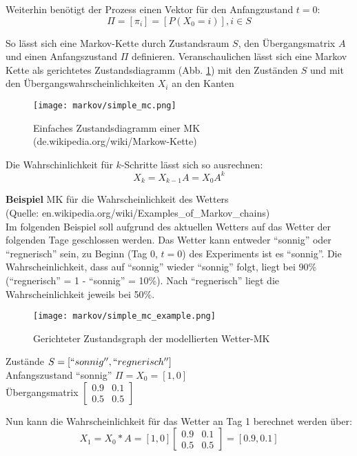 Weiterhin benötigt der Prozess einen Vektor für den Anfangzustand \( t = 0 \):
\[ \Pi = [ \pi_i] = [ P (X_0 = i) ] , i \in S \]

So lässt sich eine Markov-Kette durch Zustandsraum \(S\), den Übergangsmatrix \( A \) und einen Anfangszustand \( \Pi \) definieren.
Veranschaulichen lässt sich eine Markov Kette als gerichtetes Zustandsdiagramm (Abb. \ref{fig:simple_mc}) mit den Zuständen \(S\) und 
mit den Übergangswahrscheinlichkeiten \(X_i\) an den Kanten
\begin{figure}[htbp] \centering
    \texttt{[image: markov/simple\_mc.png]}
    \caption{Einfaches Zustandsdiagramm einer \acl{MK} (de.wikipedia.org/wiki/Markow-Kette)}
    \label{fig:simple_mc}
\end{figure}
Die Wahrschinlichkeit für \( k \)-Schritte lässt sich so ausrechnen: 
\[ X_k = X_{k-1} A = X_0 A^k \] 


\textbf{Beispiel} \acl{MK} für die Wahrscheinlichkeit des Wetters \\
(Quelle: en.wikipedia.org/wiki/Examples\_of\_Markov\_chains) \\
Im folgenden Beispiel soll aufgrund des aktuellen Wetters auf das Wetter der folgenden Tage geschlossen werden.
Das Wetter kann entweder ``sonnig'' oder ``regnerisch'' sein, zu Beginn (Tag 0, \( t = 0 \)) des Experiments ist es ``sonnig''.
Die Wahrscheinlichkeit, dass auf ``sonnig'' wieder ``sonnig'' folgt, liegt bei 90\% (``regnerisch'' = 1 - ``sonnig'' = 10\%). 
Nach ``regnerisch'' liegt die Wahrscheinlichkeit jeweils bei 50\%.  
\begin{figure}[htbp] \centering
    \texttt{[image: markov/simple\_mc\_example.png]}
    \caption{ Gerichteter Zustandsgraph der modellierten Wetter-\acl{MK} }
    \label{fig:simple_mc_example}
\end{figure}

Zustände \( S = [``sonnig'', ``regnerisch'']\) \\
Anfangszustand ``sonnig'' \( \Pi = X_0 = [1 , 0] \) \\
Übergangsmatrix \( \begin {bmatrix} 0.9&0.1\\0.5&0.5 \end {bmatrix} \)

Nun kann die Wahrscheinlichkeit für das Wetter an Tag 1 berechnet werden über: \\
\[ X_1 = X_0 * A = [ 1, 0 ] \begin {bmatrix} 0.9&0.1\\0.5&0.5 \end {bmatrix} = [ 0.9, 0.1] \]

